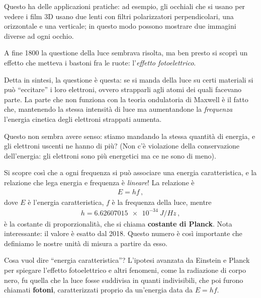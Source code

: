 \documentclass[a4paper,12pt]{article}
\begin{document}

Questo ha delle applicazioni pratiche: ad esempio, gli occhiali che si usano per vedere i film 3D usano due lenti con filtri polarizzatori perpendicolari, una orizzontale e una verticale; in questo modo possono mostrare due immagini diverse ad ogni occhio.


A fine 1800 la questione della luce sembrava risolta, ma ben presto si scoprì un effetto che metteva i bastoni fra le ruote: l'\emph{effetto fotoelettrico}.

Detta in sintesi, la questione è questa: se si manda della luce su certi materiali si può ``eccitare'' i loro elettroni, ovvero strapparli agli atomi dei quali facevano parte.
La parte che non funziona con la teoria ondulatoria di Maxwell è il fatto che, mantenendo la stessa intensità di luce ma aumentandone la \emph{frequenza} l'energia cinetica degli elettroni strappati aumenta. 

Questo non sembra avere senso: stiamo mandando la stessa quantità di energia, e gli elettroni uscenti ne hanno di più? 
(Non c'è violazione della conservazione dell'energia: gli elettroni sono più energetici ma ce ne sono di meno).

Si scopre così che a ogni frequenza si può associare una energia caratteristica, e la relazione che lega energia e frequenza è \emph{lineare}! La relazione è 
%
\begin{align}
E = h f
\,,
\end{align}
%
dove \(E\) è l'energia caratteristica, \(f\) è la frequenza della luce, mentre 
%
\begin{align}
h = \SI{6.62607015e-34}{J / Hz}
\,,
\end{align}
%
è la costante di proporzionalità, che si chiama \textbf{costante di Planck}. 
Nota interessante: il valore è esatto dal 2018. Questo numero è così importante che definiamo le nostre unità di misura a partire da esso.

Cosa vuol dire ``energia caratteristica''? 
L'ipotesi avanzata da Einstein e Planck per spiegare l'effetto fotoelettrico e altri fenomeni, come la radiazione di corpo nero, fu quella che la luce fosse suddivisa in quanti indivisibili, che poi furono chiamati \textbf{fotoni}, caratterizzati proprio da un'energia data da \(E = hf\). 
\end{document}
